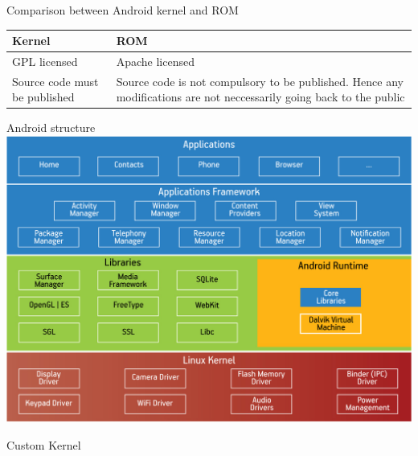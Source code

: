 \documentclass{beamer}
\begin{document}
\begin{frame}{Comparison between Android kernel and ROM}

\begin{table}
 \begin{tabular} { |p{5cm}| p{5cm}| }
 \hline
  Kernel&ROM\\
  \hline
  
  GPL licensed & Apache licensed\\
  \hline
  
  Source code must be published & Source code is not compulsory to be published.
  Hence any modifications are not neccessarily going back to the public\\
  
  \hline
  
 \end{tabular}

\end{table}
\end{frame}


\begin{frame}{Android structure}
 \includegraphics[scale=0.3]{android.jpg}
\end{frame}

\begin{frame}

\begin{center}
\Huge Custom Kernel
\end{center}
\end{frame}
\end{document}
